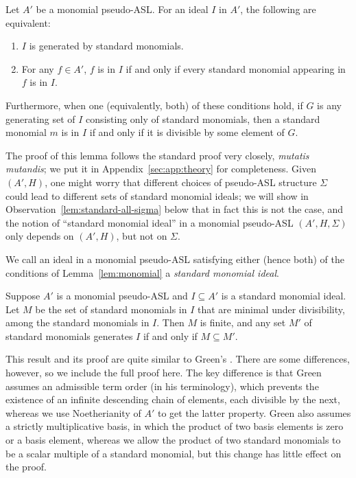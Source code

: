 \documentclass[11pt,reqno]{amsart}
\theoremstyle{definition}
\numberwithin{equation}{section}
\begin{document}
\begin{lemma}[store=lemmonomial, note=Monomial ideals in monomial pseudo-ASLs] \label{lem:monomial}
Let $A'$ be a monomial pseudo-ASL. For an ideal $I$ in $A'$, the following are equivalent:
\begin{enumerate}[label=(\Roman*),ref=(\Roman*)]
\item \label{point:gen-by-standard} $I$ is generated by standard monomials.
\item \label{point:standard-monomial-closure} For any $f \in A'$, $f$ is in $I$ if and only if every standard monomial appearing in $f$ is in $I$.
\end{enumerate}

Furthermore, when one (equivalently, both) of these conditions hold, if $G$ is any generating set of $I$ consisting only of standard monomials, then a standard monomial $m$ is in $I$ if and only if it is divisible by some element of $G$.
\end{lemma}

The proof of this lemma follows the standard proof very closely, \emph{mutatis mutandis}; we put it in Appendix~\ref{sec:app:theory} for completeness. Given $(A',H)$, one might worry that different choices of pseudo-ASL structure $\Sigma$ could lead to different sets of standard monomial ideals; we will show in Observation~\ref{lem:standard-all-sigma} below that in fact this is not the case, and the notion of ``standard monomial ideal'' in a monomial pseudo-ASL $(A', H, \Sigma)$ only depends on $(A', H)$, but not on $\Sigma$.

\begin{definition}
We call an ideal in a monomial pseudo-ASL satisfying either (hence both) of the conditions of Lemma~\ref{lem:monomial} a \emph{standard monomial ideal}.
\end{definition}

\begin{lemma} \label{lem:unique-min}
Suppose $A'$ is a monomial pseudo-ASL and $I \subseteq A'$ is a standard monomial ideal. Let $M$ be the set of standard monomials in $I$ that are minimal under divisibility, among the standard monomials in $I$. Then $M$ is finite, and any set $M'$ of standard monomials generates $I$ if and only if $M \subseteq M'$.
\end{lemma}

This result and its proof are quite similar to Green's \cite[Proposition 2.5]{green}. There are some differences, however, so we include the full proof here. The key difference is that Green assumes an admissible term order (in his terminology), which prevents the existence of an infinite descending chain of elements, each divisible by the next, whereas we use Noetherianity of $A'$ to get the latter property. Green also assumes a strictly multiplicative basis, in which the product of two basis elements is zero or a basis element, whereas we allow the product of two standard monomials to be a scalar multiple of a standard monomial, but this change has little effect on the proof.
\end{document}

